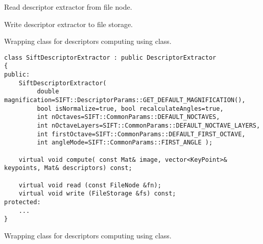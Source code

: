 
\begin{description}
\end{description}

Read descriptor extractor from file node.


\begin{description}
\end{description}

Write descriptor extractor to file storage.


\begin{description}
\end{description}

Wrapping class for descriptors computing using  class.

\begin{lstlisting}
class SiftDescriptorExtractor : public DescriptorExtractor
{
public:
    SiftDescriptorExtractor( 
	     double magnification=SIFT::DescriptorParams::GET_DEFAULT_MAGNIFICATION(),
	     bool isNormalize=true, bool recalculateAngles=true,
	     int nOctaves=SIFT::CommonParams::DEFAULT_NOCTAVES,
	     int nOctaveLayers=SIFT::CommonParams::DEFAULT_NOCTAVE_LAYERS,
	     int firstOctave=SIFT::CommonParams::DEFAULT_FIRST_OCTAVE,
	     int angleMode=SIFT::CommonParams::FIRST_ANGLE );

    virtual void compute( const Mat& image, vector<KeyPoint>& keypoints, Mat& descriptors) const;

    virtual void read (const FileNode &fn);
    virtual void write (FileStorage &fs) const;
protected:
    ...
}
\end{lstlisting}

Wrapping class for descriptors computing using  class.

